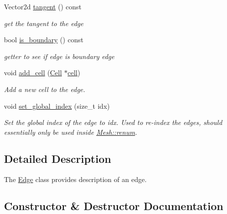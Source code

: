 \begin{DoxyCompactItemize}
Vector2d \hyperlink{group__Mesh_ga3362368ff28f1e128bbc46615fd24cd7}{tangent} () const
\begin{DoxyCompactList}\small\item\em get the tangent to the edge \end{DoxyCompactList}\item 
bool \hyperlink{group__Mesh_ga10424f4b99793ab359b5dd099f9255ee}{is\+\_\+boundary} () const
\begin{DoxyCompactList}\small\item\em getter to see if edge is boundary edge \end{DoxyCompactList}\item 
\mbox{\label{classHArDCore2D_1_1Edge_a364bacf89dfa0be36abbbadbb2dd4f78}} 
void \hyperlink{classHArDCore2D_1_1Edge_a364bacf89dfa0be36abbbadbb2dd4f78}{add\+\_\+cell} (\hyperlink{classHArDCore2D_1_1Cell}{Cell} $\ast$\hyperlink{classHArDCore2D_1_1Edge_ad4be0bfb981ccf2c1e02e870772dbdc3}{cell})
\begin{DoxyCompactList}\small\item\em Add a new cell to the edge. \end{DoxyCompactList}\item 
\mbox{\label{classHArDCore2D_1_1Edge_a150b8b31cd1b608d6ce8b020227a6db2}} 
void \hyperlink{classHArDCore2D_1_1Edge_a150b8b31cd1b608d6ce8b020227a6db2}{set\+\_\+global\+\_\+index} (size\+\_\+t idx)
\begin{DoxyCompactList}\small\item\em Set the global index of the edge to idx. Used to re-\/index the edges, should essentially only be used inside \hyperlink{classHArDCore2D_1_1Mesh_af77873bbc892a7a5b37bf4773c55aefc}{Mesh\+::renum}. \end{DoxyCompactList}\end{DoxyCompactItemize}


\subsection{Detailed Description}
The \hyperlink{classHArDCore2D_1_1Edge}{Edge} class provides description of an edge. 

\subsection{Constructor \& Destructor Documentation}
\mbox{\label{classHArDCore2D_1_1Edge_a1bca27244cfcd45e24e0b7485f148ddf}} 
